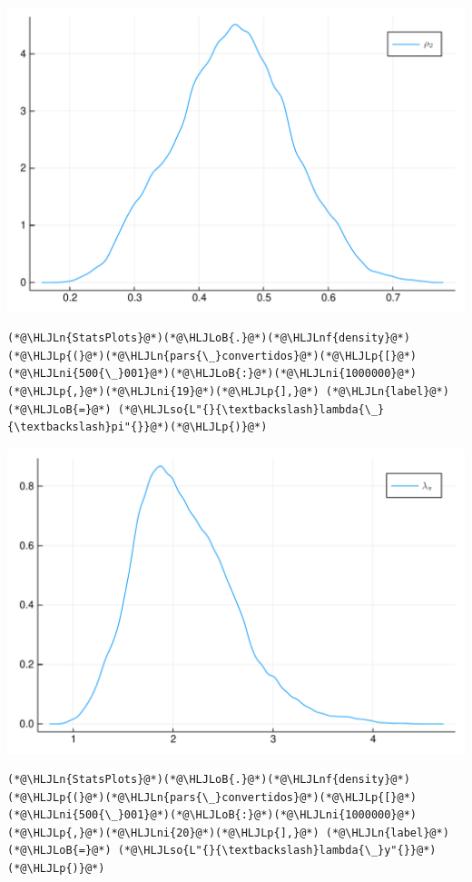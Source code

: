 \documentclass[12pt,a4paper]{article}
\newcommand{\HLJLn}[1]{#1}
\newcommand{\HLJLnf}[1]{\textcolor[RGB]{66,102,213}{#1}}
\newcommand{\HLJLso}[1]{\textcolor[RGB]{201,61,57}{#1}}
\newcommand{\HLJLni}[1]{\textcolor[RGB]{59,151,46}{#1}}
\newcommand{\HLJLoB}[1]{\textcolor[RGB]{102,102,102}{\textbf{#1}}}
\newcommand{\HLJLp}[1]{#1}
\begin{document}
\includegraphics[width=\linewidth]{figures/carlos_mcmc_19_1.pdf}

\begin{lstlisting}
(*@\HLJLn{StatsPlots}@*)(*@\HLJLoB{.}@*)(*@\HLJLnf{density}@*)(*@\HLJLp{(}@*)(*@\HLJLn{pars{\_}convertidos}@*)(*@\HLJLp{[}@*)(*@\HLJLni{500{\_}001}@*)(*@\HLJLoB{:}@*)(*@\HLJLni{1000000}@*)(*@\HLJLp{,}@*)(*@\HLJLni{19}@*)(*@\HLJLp{],}@*) (*@\HLJLn{label}@*)(*@\HLJLoB{=}@*) (*@\HLJLso{L"{}{\textbackslash}lambda{\_}{\textbackslash}pi"{}}@*)(*@\HLJLp{)}@*)
\end{lstlisting}

\includegraphics[width=\linewidth]{figures/carlos_mcmc_20_1.pdf}

\begin{lstlisting}
(*@\HLJLn{StatsPlots}@*)(*@\HLJLoB{.}@*)(*@\HLJLnf{density}@*)(*@\HLJLp{(}@*)(*@\HLJLn{pars{\_}convertidos}@*)(*@\HLJLp{[}@*)(*@\HLJLni{500{\_}001}@*)(*@\HLJLoB{:}@*)(*@\HLJLni{1000000}@*)(*@\HLJLp{,}@*)(*@\HLJLni{20}@*)(*@\HLJLp{],}@*) (*@\HLJLn{label}@*)(*@\HLJLoB{=}@*) (*@\HLJLso{L"{}{\textbackslash}lambda{\_}y"{}}@*)(*@\HLJLp{)}@*)
\end{lstlisting}
\end{document}
